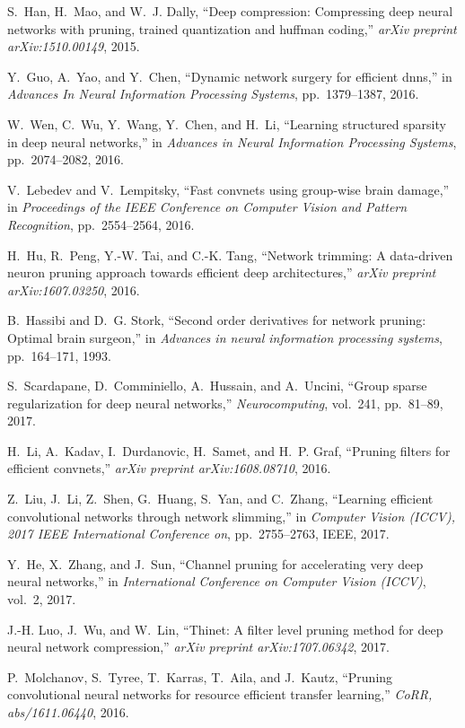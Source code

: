 \documentclass[runningheads]{llncs}
\begin{document}
\begin{thebibliography}{8}
S.~Han, H.~Mao, and W.~J. Dally, ``Deep compression: Compressing deep neural
  networks with pruning, trained quantization and huffman coding,'' {\em arXiv
  preprint arXiv:1510.00149}, 2015.

Y.~Guo, A.~Yao, and Y.~Chen, ``Dynamic network surgery for efficient dnns,'' in
  {\em Advances In Neural Information Processing Systems}, pp.~1379--1387,
  2016.

W.~Wen, C.~Wu, Y.~Wang, Y.~Chen, and H.~Li, ``Learning structured sparsity in
  deep neural networks,'' in {\em Advances in Neural Information Processing
  Systems}, pp.~2074--2082, 2016.

V.~Lebedev and V.~Lempitsky, ``Fast convnets using group-wise brain damage,''
  in {\em Proceedings of the IEEE Conference on Computer Vision and Pattern
  Recognition}, pp.~2554--2564, 2016.

H.~Hu, R.~Peng, Y.-W. Tai, and C.-K. Tang, ``Network trimming: A data-driven
  neuron pruning approach towards efficient deep architectures,'' {\em arXiv
  preprint arXiv:1607.03250}, 2016.

B.~Hassibi and D.~G. Stork, ``Second order derivatives for network pruning:
  Optimal brain surgeon,'' in {\em Advances in neural information processing
  systems}, pp.~164--171, 1993.

S.~Scardapane, D.~Comminiello, A.~Hussain, and A.~Uncini, ``Group sparse
  regularization for deep neural networks,'' {\em Neurocomputing}, vol.~241,
  pp.~81--89, 2017.

H.~Li, A.~Kadav, I.~Durdanovic, H.~Samet, and H.~P. Graf, ``Pruning filters for
  efficient convnets,'' {\em arXiv preprint arXiv:1608.08710}, 2016.

Z.~Liu, J.~Li, Z.~Shen, G.~Huang, S.~Yan, and C.~Zhang, ``Learning efficient
  convolutional networks through network slimming,'' in {\em Computer Vision
  (ICCV), 2017 IEEE International Conference on}, pp.~2755--2763, IEEE, 2017.

Y.~He, X.~Zhang, and J.~Sun, ``Channel pruning for accelerating very deep
  neural networks,'' in {\em International Conference on Computer Vision
  (ICCV)}, vol.~2, 2017.

J.-H. Luo, J.~Wu, and W.~Lin, ``Thinet: A filter level pruning method for deep
  neural network compression,'' {\em arXiv preprint arXiv:1707.06342}, 2017.

P.~Molchanov, S.~Tyree, T.~Karras, T.~Aila, and J.~Kautz, ``Pruning
  convolutional neural networks for resource efficient transfer learning,''
  {\em CoRR, abs/1611.06440}, 2016.


\end{thebibliography}
\end{document}
